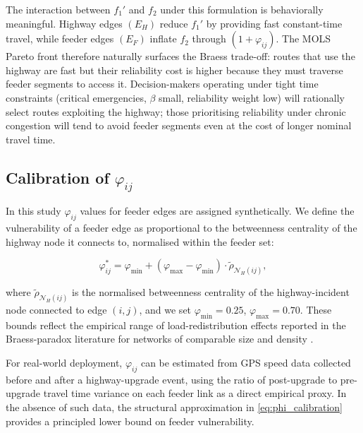 \begin{remark}
The interaction between $f_1'$ and $f_2$ under this formulation is
behaviorally meaningful. Highway edges $(E_H)$ reduce $f_1'$ by
providing fast constant-time travel, while feeder edges $(E_F)$ inflate
$f_2$ through $(1+\varphi_{ij})$. The MOLS Pareto front therefore
naturally surfaces the Braess trade-off: routes that use the highway are
fast but their reliability cost is higher because they must traverse
feeder segments to access it. Decision-makers operating under tight time
constraints (critical emergencies, $\beta$ small, reliability weight low)
will rationally select routes exploiting the highway; those prioritising
reliability under chronic congestion will tend to avoid feeder segments
even at the cost of longer nominal travel time.
\end{remark}

\subsection{Calibration of $\varphi_{ij}$}
\label{subsec:phi_calibration}

In this study $\varphi_{ij}$ values for feeder edges are assigned
synthetically. We define the vulnerability of a feeder edge as
proportional to the betweenness centrality of the highway node it
connects to, normalised within the feeder set:

\begin{equation}
  \varphi_{ij}^{*}
  = \varphi_{\min}
    + (\varphi_{\max}-\varphi_{\min})
      \cdot \widetilde{\rho}_{\mathcal{N}_H(ij)},
  \label{eq:phi_calibration}
\end{equation}

where $\widetilde{\rho}_{\mathcal{N}_H(ij)}$ is the normalised
betweenness centrality of the highway-incident node connected to edge
$(i,j)$, and we set $\varphi_{\min}=0.25$, $\varphi_{\max}=0.70$.
These bounds reflect the empirical range of load-redistribution effects
reported in the Braess-paradox literature for networks of comparable
size and density \cite{11}.

For real-world deployment, $\varphi_{ij}$ can be estimated from GPS
speed data collected before and after a highway-upgrade event, using
the ratio of post-upgrade to pre-upgrade travel time variance on each
feeder link as a direct empirical proxy. In the absence of such data,
the structural approximation in \eqref{eq:phi_calibration} provides a
principled lower bound on feeder vulnerability.

